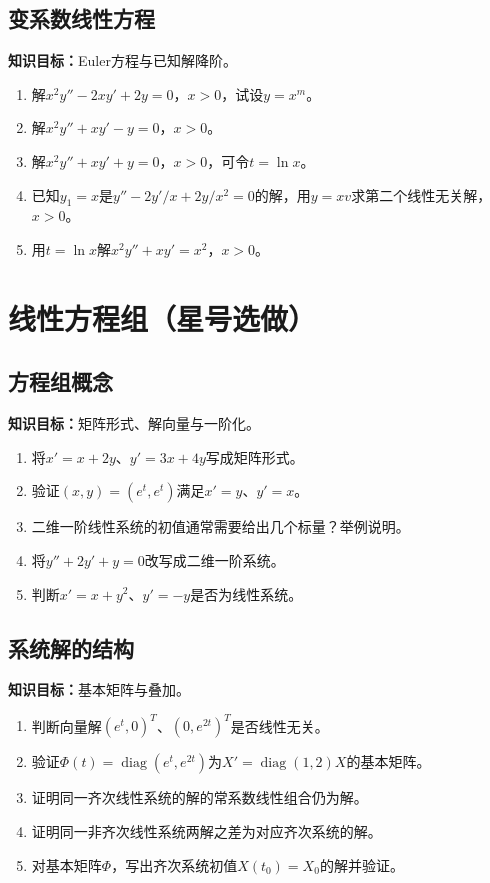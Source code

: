 \documentclass[11pt,a4paper,fontset=fandol]{ctexrep}
\newcommand{\goal}[1]{\textbf{知识目标：}#1\par}
\begin{document}
\subsection{变系数线性方程}
\goal{Euler方程与已知解降阶。}
\begin{enumerate}
\item 解$x^2y''-2xy'+2y=0$，$x>0$，试设$y=x^m$。
\item 解$x^2y''+xy'-y=0$，$x>0$。
\item 解$x^2y''+xy'+y=0$，$x>0$，可令$t=\ln x$。
\item 已知$y_1=x$是$y''-2y'/x+2y/x^2=0$的解，用$y=xv$求第二个线性无关解，$x>0$。
\item 用$t=\ln x$解$x^2y''+xy'=x^2$，$x>0$。
\end{enumerate}
\section{线性方程组（星号选做）}
\subsection{方程组概念}
\goal{矩阵形式、解向量与一阶化。}
\begin{enumerate}
\item 将$x'=x+2y$、$y'=3x+4y$写成矩阵形式。
\item 验证$(x,y)=(e^t,e^t)$满足$x'=y$、$y'=x$。
\item 二维一阶线性系统的初值通常需要给出几个标量？举例说明。
\item 将$y''+2y'+y=0$改写成二维一阶系统。
\item 判断$x'=x+y^2$、$y'=-y$是否为线性系统。
\end{enumerate}
\subsection{系统解的结构}
\goal{基本矩阵与叠加。}
\begin{enumerate}
\item 判断向量解$(e^t,0)^T$、$(0,e^{2t})^T$是否线性无关。
\item 验证$\Phi(t)=\operatorname{diag}(e^t,e^{2t})$为$X'=\operatorname{diag}(1,2)X$的基本矩阵。
\item 证明同一齐次线性系统的解的常系数线性组合仍为解。
\item 证明同一非齐次线性系统两解之差为对应齐次系统的解。
\item 对基本矩阵$\Phi$，写出齐次系统初值$X(t_0)=X_0$的解并验证。
\end{enumerate}
\end{document}
